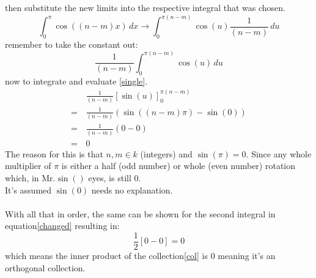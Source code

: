 \documentclass[12pt]{article}
\begin{document}
then substitute the new limits into the respective integral that was chosen.
\begin{equation*}
    \int_{0}^{\pi} \cos((n-m)x) \, dx \to \int_{0}^{\pi(n-m)} \cos(u) \frac{1}{(n-m)} \, du
\end{equation*}
remember to take the constant out:
\begin{equation} \label{single}
    \frac{1}{(n-m)} \int_{0}^{\pi(n-m)} \cos(u) \, du
\end{equation}
now to integrate and evaluate \eqref{single}.
\begin{align*}
    &\frac{1}{(n-m)} [\sin(u)]_{0}^{\pi(n-m)}  \\
 =\, &\frac{1}{(n-m)}(\sin((n-m)\pi) - \sin(0)) \\
 = \, & \frac{1}{(n-m)}(0-0) \\
 = \, & 0
\end{align*}
The reason for this is that $n,m\in k$ (integers) and $\sin(\pi) = 0$. Since any whole multiplier of $\pi$ is either a half (odd number) or whole (even number) rotation which, in Mr.$\sin()$ eyes, is still $0$.\\
It's assumed $\sin(0)$ needs no explanation.\\\\
With all that in order, the same can be shown for the second integral in equation\eqref{changed} resulting in:
\begin{equation*}
    \frac{1}{2}[0-0] = 0
\end{equation*}
which means the inner product of the collection\eqref{col} is $0$ meaning it's an orthogonal collection.
\end{document}
